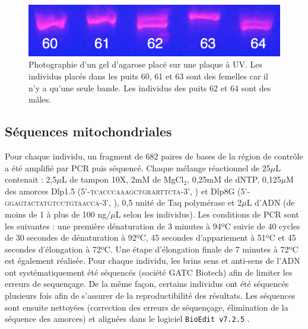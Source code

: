 \documentclass[a4paper,12pt,twoside]{article}\usepackage[]{graphicx}\usepackage[]{color}
\begin{document}
\begin{figure}[htbp]
	\centering
		\includegraphics[width=.7\textwidth]{photo}
	\caption[Photographie d'un gel d'agarose placé sur une plaque à UV]{Photographie d'un gel d'agarose placé sur une plaque à UV. Les individus placés dans les puits 60, 61 et 63 sont des femelles car il n'y a qu'une seule bande. Les individus des puits 62 et 64 sont des mâles.}
	\label{fig:photo}
\end{figure}


\subsection{Séquences mitochondriales}

Pour chaque individu, un fragment de 682 paires de bases de la région de contrôle a été amplifié par PCR puis séquencé. Chaque mélange réactionnel de 25$\mu$L contenait : 2,5$\mu$L de tampon 10X, 2mM de MgCl$_2$, 0,25mM de dNTP, 0,125$\mu$M des amorces Dlp1.5 (5'-\textsc{tcacccaaagctgrarttcta}-3', \citealt{baker1998}) et Dlp8G (5'-\textsc{ggagtactatgtcctgtaacca}-3', \citealt{dalebout2005}), 0,5 unité de Taq polymérase et 2$\mu$L d'ADN (de moins de 1 à plus de 100 ng/$\mu$L selon les individus). Les conditions de PCR sont les suivantes : une première dénaturation de 3 minutes à 94ºC suivie de 40 cycles de 30 secondes de dénaturation à 92ºC, 45 secondes d'appariement à 51ºC et 45 secondes d'élongation à 72ºC. Une étape d'élongation finale de 7 minutes à 72ºC est également réalisée. Pour chaque individu, les brins sens et anti-sens de l'ADN ont systématiquement été séquencés (société GATC Biotech) afin de limiter les erreurs de sequençage. De la même façon, certains individus ont été séquencés plusieurs fois afin de s'assurer de la reproductibilité des résultats. Les séquences sont ensuite nettoyées (correction des erreurs de séquençage, élimination de la séquence des amorces) et alignées dans le logiciel \texttt{BioEdit}\texttrademark~\texttt{v7.2.5} \citep{hall1999}.
\end{document}
